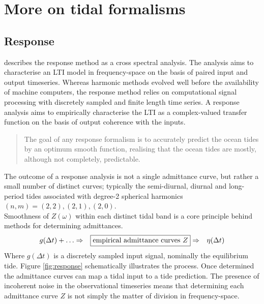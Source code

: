 \chapter{More on tidal formalisms}
\label{appendix:tideFormalisms}
\section{Response}
\citet{Godin:1991vx} describes the response method as a cross spectral analysis.  The analysis aims to characterise an LTI model in frequency-space on the basis of paired input and output timeseries.
Whereas harmonic methods evolved well before the availability of machine computers, the response method relies on computational signal processing with discretely sampled and finite length time series.
A response analysis aims to empirically characterise the LTI as a complex-valued transfer function on the basis of output coherence with the inputs. 
\begin{quotation}
The goal of any response formalism is to accurately predict the ocean tides by an optimum smooth function, realising that the ocean tides are mostly, although not completely, predictable.
\end{quotation}
The outcome of a response analysis is not a single admittance curve, but rather a small number of distinct curves; typically the semi-diurnal, diurnal and long-period tides associated with degree-2 spherical harmonics $(n,m)=(2,2),(2,1),(2,0)$.\\
Smoothness of $Z(\omega)$ within each distinct tidal band is a core principle behind methods for determining admittances.  
\begin{align}
    \label{E:response}
    g(\Delta t) + \dots &\Rightarrow & \fbox{empirical admittance curves $Z$} &\Rightarrow & \mbox{$\eta(\Delta t)$}  %
\end{align}
Where $g(\Delta t)$ is a discretely sampled input signal, nominally the equilibrium tide.   Figure \ref{fig:response} schematically illustrates the process.
Once determined the admittance curves can map a tidal input to a tide prediction.
The presence of incoherent noise in the observational timeseries means that determining each admittance curve $Z$ is not simply the matter of division in frequency-space.


